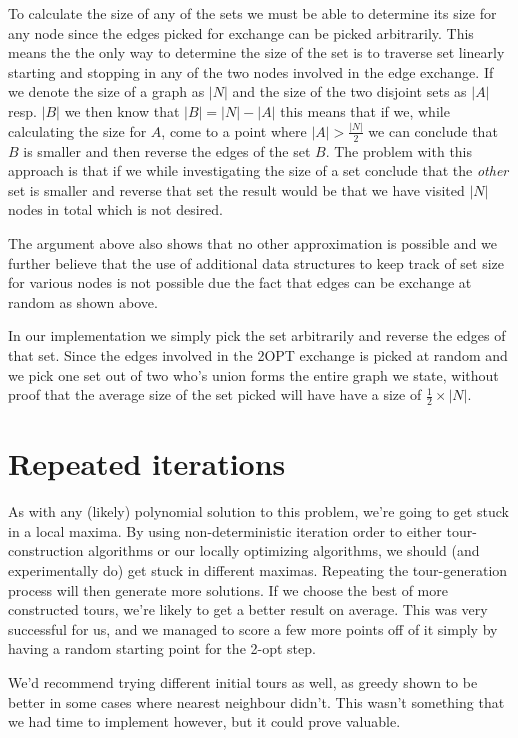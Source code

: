 \documentclass[a4paper,12pt,oneside]{article}
\begin{document}
To calculate the size of any of the sets we must be able to determine its size for any node since the edges picked for exchange can be picked arbitrarily. This means the the only way to determine the size of the set is to traverse set linearly starting and stopping in any of the two nodes involved in the edge exchange. If we denote the size of a graph as $|N|$ and the size of the two disjoint sets as $|A|$ resp. $|B|$ we then know that $|B| = |N| - |A|$ this means that if we, while calculating the size for $A$, come to a point where $|A| > \frac{|N|}{2}$ we can conclude that $B$ is smaller and then reverse the edges of the set $B$. The problem with this approach is that if we while investigating the size of a set conclude that the \textit{other} set is smaller and reverse that set the result would be that we have visited $|N|$ nodes in total which is not desired. 

The argument above also shows that no other approximation is possible and we further believe that the use of additional data structures to keep track of set size for various nodes is not possible due the fact that edges can be exchange at random as shown above.

In our implementation we simply pick the set arbitrarily and reverse the edges of that set. Since the edges involved in the 2OPT exchange is picked at random and we pick one set out of two who's union forms the entire graph we state, without proof that the average size of the set picked will have have a size of $\frac{1}{2} \times |N|$.


\section{Repeated iterations}

As with any (likely) polynomial solution to this problem, we're going to get stuck in a local maxima. By using non-deterministic iteration order to either tour-construction algorithms or our locally optimizing algorithms, we should (and experimentally do) get stuck in different maximas. Repeating the tour-generation process will then generate more solutions. If we choose the best of more constructed tours, we're likely to get a better result on average. This was very successful for us, and we managed to score a few more points off of it simply by having a random starting point for the 2-opt step.

We'd recommend trying different initial tours as well, as greedy shown to be better in some cases where nearest neighbour didn't. This wasn't something that we had time to implement however, but it could prove valuable.
\end{document}
